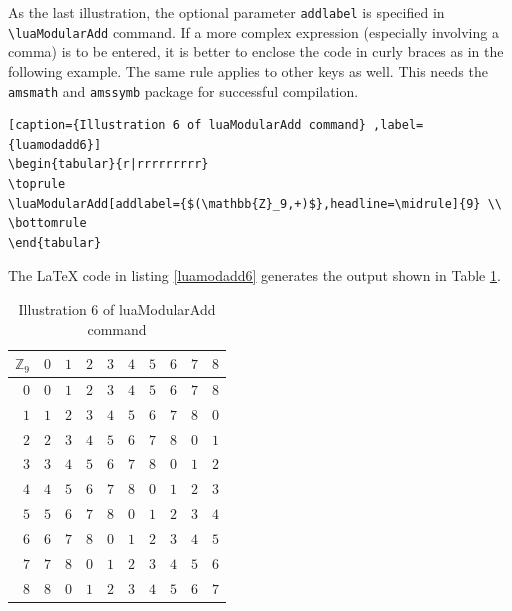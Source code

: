 ﻿\documentclass{article}
\begin{document}
As the last illustration, the optional parameter \verb|addlabel| is specified  in  \verb|\luaModularAdd| command.  If  a more complex expression (especially involving  a comma) is to be entered, it is better to enclose the code in curly braces as in the following example. The same rule  applies to other keys as well. This needs the \verb|amsmath| and \verb|amssymb| package for successful compilation.
\begin{lstlisting}[caption={Illustration 6 of luaModularAdd command} ,label={luamodadd6}]
\begin{tabular}{r|rrrrrrrrr}
\toprule
\luaModularAdd[addlabel={$(\mathbb{Z}_9,+)$},headline=\midrule]{9} \\
\bottomrule
\end{tabular}
\end{lstlisting}
The LaTeX code in listing \ref{luamodadd6} generates the output shown in Table  \ref{luamodadd6tbl}.
\begin{table}[H]
\centering
\begin{tabular}{r|rrrrrrrrr}
\toprule
$\mathbb{Z}_9$  & $0$ & $1$ & $2$ & $3$ & $4$ & $5$ & $6$ & $7$ & $8$\\ \midrule $0$ & $0$ & $1$ & $2$ & $3$ & $4$ & $5$ & $6$ & $7$ & $8$\\ $1$ & $1$ & $2$ & $3$ & $4$ & $5$ & $6$ & $7$ & $8$ & $0$\\ $2$ & $2$ & $3$ & $4$ & $5$ & $6$ & $7$ & $8$ & $0$ & $1$\\ $3$ & $3$ & $4$ & $5$ & $6$ & $7$ & $8$ & $0$ & $1$ & $2$\\ $4$ & $4$ & $5$ & $6$ & $7$ & $8$ & $0$ & $1$ & $2$ & $3$\\ $5$ & $5$ & $6$ & $7$ & $8$ & $0$ & $1$ & $2$ & $3$ & $4$\\ $6$ & $6$ & $7$ & $8$ & $0$ & $1$ & $2$ & $3$ & $4$ & $5$\\ $7$ & $7$ & $8$ & $0$ & $1$ & $2$ & $3$ & $4$ & $5$ & $6$\\ $8$ & $8$ & $0$ & $1$ & $2$ & $3$ & $4$ & $5$ & $6$ & $7$ \\
\bottomrule
\end{tabular}
\caption{Illustration 6 of luaModularAdd command}
\label{luamodadd6tbl}
\end{table}

\printbibliography
\end{document}
